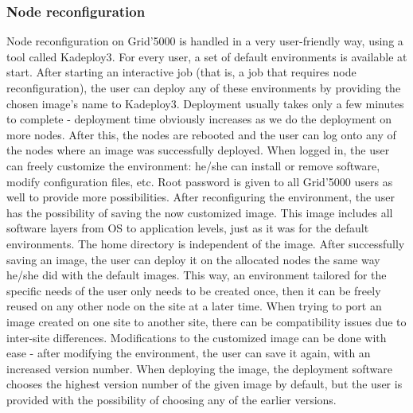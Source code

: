 \subsubsection{Node reconfiguration}
Node reconfiguration on Grid'5000 is handled in a very user-friendly
way, using a tool called Kadeploy3\cite{jsn13}. For every user, a set
of default environments is available at start. After starting an
interactive job (that is, a job that requires node reconfiguration),
the user can deploy any of these environments by providing the chosen
image's name to Kadeploy3. Deployment usually takes only a few minutes
to complete - deployment time obviously increases as we do the
deployment on more nodes. After this, the nodes are rebooted and the
user can log onto any of the nodes where an image was successfully
deployed. When logged in, the user can freely customize the
environment: he/she can
install or remove software, modify configuration files, etc. Root
password is given to all Grid'5000 users as well to provide more
possibilities. After reconfiguring the environment, the user has
the possibility of saving the now customized image. This image
includes all software layers from OS to application levels, just as it
was for the default environments. The home directory is independent of
the image. After successfully saving an image, the user can deploy it
on the allocated nodes the same way he/she did with the default
images. This way, an environment tailored for the specific needs of
the user only needs to be created once, then it can be freely reused
on any other node on the site at a later time. When trying to port an
image created on one site to another site, there can be compatibility
issues due to inter-site differences. Modifications to the customized
image can be done with ease - after modifying the environment, the
user can save it again, with an increased version number. When
deploying the image, the deployment software chooses the highest
version number of the given image by default, but the user is provided
with the possibility of choosing any of the earlier versions.
